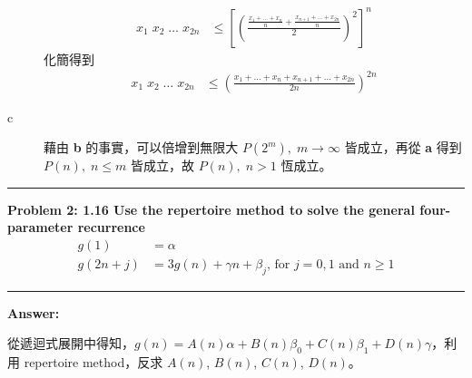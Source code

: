 \documentclass[11pt]{article}
\newcommand\question[2]{\vspace{.25in}\hrule\textbf{#1: #2}\vspace{.5em}\hrule\vspace{.10in}}
\renewcommand\part[1]{\vspace{.10in}\textbf{#1}}
\begin{document}
\begin{description}
\begin{equation}
\begin{split}
			x_1 \; x_2 \; \hdots \; x_{2n} & \le \left [ \left ( 
				\frac{
					\frac{x_1 + \hdots + x_n}{n} + \frac{x_{n+1} + \hdots + x_{2n}}{n}
					}{2} 
				\right )^2 \right ]^n
		\end{split}
		\end{equation}
		化簡得到
		\begin{equation}
		\begin{split}
			x_1 \; x_2 \; \hdots \; x_{2n} & \le \left ( 
				\frac{
					x_1 + \hdots + x_n + x_{n+1} + \hdots + x_{2n}
					}{2n} 
				\right )^{2n}
		\end{split}
		\end{equation}
	\item[c] 藉由 \textbf{b} 的事實，可以倍增到無限大 $P(2^{m}), \; m \rightarrow \infty$ 皆成立，再從 \textbf{a} 得到 $P(n), \; n \le m$ 皆成立，故 $P(n), \; n > 1$ 恆成立。
\end{description}


\question{Problem 2}{1.16 Use the repertoire method to solve the general four-parameter recurrence
		\begin{equation}
		\begin{split}
			g(1) &= \alpha \\
			g(2n+j) &= 3 g(n) + \gamma n + \beta_j \text{, for } j = 0, 1 \text{ and } n \ge 1
		\end{split}
		\end{equation}
}

\part{Answer:} 

從遞迴式展開中得知，$g(n) = A(n) \alpha + B(n) \beta_0 + C(n) \beta_1 + D(n) \gamma$，利用 repertoire method，反求 $A(n)$, $B(n)$, $C(n)$, $D(n)$。
\end{document}
